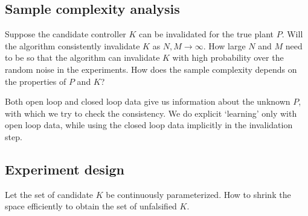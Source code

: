 \documentclass[11pt, onecolumn]{article}
\begin{document}
\subsection{Sample complexity analysis}

Suppose the candidate controller $K$ can be invalidated for the true plant $P$.   Will
the algorithm consistently invalidate $K$ as $N,M\to\infty$.  How large $N$ and $M$ need to be so that the
algorithm can invalidate $K$ with high probability over the random noise in the experiments. How
does the sample complexity depends on the properties of $P$ and $K$?

Both open loop and closed loop data give us information about the unknown $P$, with which we try to
check the consistency.  We do explicit `learning' only with open loop data, while using the closed
loop data implicitly in the invalidation step.


\subsection{Experiment design}

Let the set of candidate $K$ be continuously parameterized. How to shrink the space efficiently to
obtain the set of unfalsified $K$.

\end{document}
